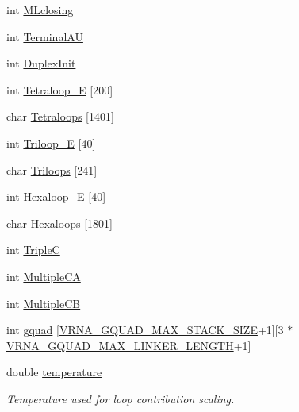 \begin{DoxyCompactItemize}
\item 
int \mbox{\hyperlink{group__energy__parameters_a585d850089d454a367daef9ce2fc8395}{M\+Lclosing}}
\item 
int \mbox{\hyperlink{group__energy__parameters_a0ad35507a03ba7f751e82cb375e991dd}{Terminal\+AU}}
\item 
int \mbox{\hyperlink{group__energy__parameters_a86f6ae1e5649264f7ad82969a49bb09e}{Duplex\+Init}}
\item 
int \mbox{\hyperlink{group__energy__parameters_a3a853cc7dbad832e377d03c2be09f3a0}{Tetraloop\+\_\+E}} \mbox{[}200\mbox{]}
\item 
char \mbox{\hyperlink{group__energy__parameters_a2fda2f47699f66eb79becc63481dc7a5}{Tetraloops}} \mbox{[}1401\mbox{]}
\item 
int \mbox{\hyperlink{group__energy__parameters_a779303656223c8f9f12a7bdb877ae4ae}{Triloop\+\_\+E}} \mbox{[}40\mbox{]}
\item 
char \mbox{\hyperlink{group__energy__parameters_a5824325d79edfe569c6023f52a08d7be}{Triloops}} \mbox{[}241\mbox{]}
\item 
int \mbox{\hyperlink{group__energy__parameters_a9fa7c16fb78efb6e2730b6553282ebf9}{Hexaloop\+\_\+E}} \mbox{[}40\mbox{]}
\item 
char \mbox{\hyperlink{group__energy__parameters_a1b32fef887ebf8097da6f5913743794c}{Hexaloops}} \mbox{[}1801\mbox{]}
\item 
int \mbox{\hyperlink{group__energy__parameters_ac9ca6eda834acca6eee5d00ee3ee69c9}{TripleC}}
\item 
int \mbox{\hyperlink{group__energy__parameters_a481323a736818349ec7c66ebf01825c6}{Multiple\+CA}}
\item 
int \mbox{\hyperlink{group__energy__parameters_a465b7758e3d105f10a6fa7958024abb4}{Multiple\+CB}}
\item 
int \mbox{\hyperlink{group__energy__parameters_ae614af2c628faa36c8007bd054be21d9}{gquad}} \mbox{[}\mbox{\hyperlink{group__energy__parameters_gab7b5159125a90babbd3b81319305f35f}{V\+R\+N\+A\+\_\+\+G\+Q\+U\+A\+D\+\_\+\+M\+A\+X\+\_\+\+S\+T\+A\+C\+K\+\_\+\+S\+I\+ZE}}+1\mbox{]}\mbox{[}3 $\ast$\mbox{\hyperlink{group__energy__parameters_gaabc251a60f6dbe927dd3a3881a161fb7}{V\+R\+N\+A\+\_\+\+G\+Q\+U\+A\+D\+\_\+\+M\+A\+X\+\_\+\+L\+I\+N\+K\+E\+R\+\_\+\+L\+E\+N\+G\+TH}}+1\mbox{]}
\item 
double \mbox{\hyperlink{group__energy__parameters_aeed2cd83713012bcb52e431041e037c8}{temperature}}
\begin{DoxyCompactList}\small\item\em Temperature used for loop contribution scaling. \end{DoxyCompactList}\item 

\end{DoxyCompactItemize}
